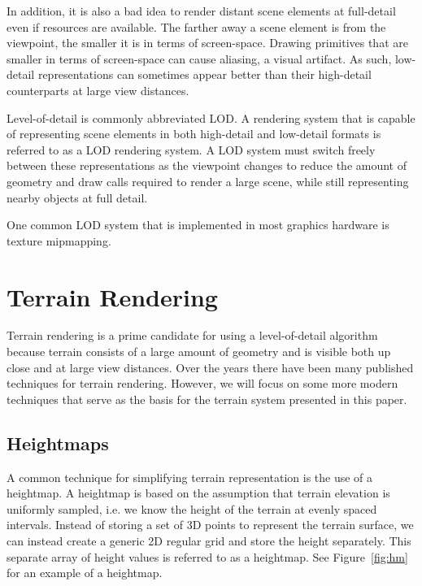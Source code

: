 In addition, it is also a bad idea to render distant scene elements at full-detail even if resources are available.
The farther away a scene element is from the viewpoint, the smaller it is in terms of screen-space.
Drawing primitives that are smaller in terms of screen-space can cause aliasing, a visual artifact.
As such, low-detail representations can sometimes appear better than their high-detail counterparts at large view distances.

Level-of-detail is commonly abbreviated LOD.
A rendering system that is capable of representing scene elements in both high-detail and low-detail formats is referred to as a LOD rendering system.
A LOD system must switch freely between these representations as the viewpoint changes to reduce the amount of geometry and draw calls required to render a large scene, while still representing nearby objects at full detail.

One common LOD system that is implemented in most graphics hardware is texture mipmapping. \cite{opengl_mipmaps}


\section{Terrain Rendering} \label{terrain_render}

Terrain rendering is a prime candidate for using a level-of-detail algorithm because terrain consists of a large amount of geometry and is visible both up close and at large view distances.
Over the years there have been many published techniques for terrain rendering.
\cite{hardware_lod}
\cite{roambetter}
\cite{bruneton_terrain}
\cite{p-bdam}
\cite{righttri}
\cite{diamondterrain}
\cite{roam}
\cite{clod}
However, we will focus on some more modern techniques that serve as the basis for the terrain system presented in this paper.


\subsection{Heightmaps}

A common technique for simplifying terrain representation is the use of a heightmap.
A heightmap is based on the assumption that terrain elevation is uniformly sampled, i.e. we know the height of the terrain at evenly spaced intervals.
Instead of storing a set of 3D points to represent the terrain surface, we can instead create a generic 2D regular grid and store the height separately.
This separate array of height values is referred to as a heightmap.
See Figure~\ref{fig:hm} for an example of a heightmap.

